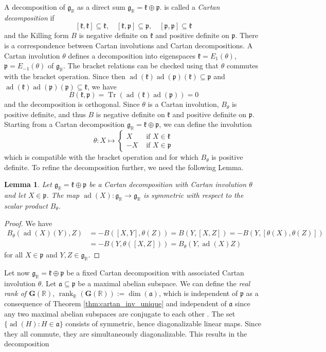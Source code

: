 \documentclass[12pt]{amsart}
\newcommand{\R}{\mathbb{R} }
\newcommand{\frakg}{\mathfrak{g}}
\newcommand{\frakp}{\mathfrak{p}}
\newcommand{\frakk}{\mathfrak{k}}
\newcommand{\fraka}{\mathfrak{a}}
\newcommand{\bG}{\mathbf{G}}
\numberwithin{equation}{section}
\newtheorem{lemma}[theorem]{Lemma}
\theoremstyle{remark} %
\begin{document}
A decomposition of $\frakg_\R$ as a direct sum $
\frakg_\R =  \frakk \oplus \frakp.
$
is called a \emph{Cartan decomposition} if
$$
[\frakk, \frakk] \subseteq \frakk, \quad [\frakk, \frakp] \subseteq \frakp , \quad [\frakp, \frakp] \subseteq \frakk
$$
and the Killing form $B$ is negative definite on $\frakk$ and positive definite on $\frakp$. There is a correspondence between Cartan involutions and Cartan decompositions. A Cartan involution $\theta$ defines a decomposition into eigenspaces $\frakk = E_{1}(\theta)$, $\frakp = E_{-1}(\theta)$ of $\frakg_\R$. The bracket relations can be checked using that $\theta$ commutes with the bracket operation. Since then $\operatorname{ad}(\frakk)\operatorname{ad}(\frakp)(\frakk) \subseteq \frakp$ and $\operatorname{ad}(\frakk)\operatorname{ad}(\frakp)(\frakp) \subseteq \frakk$, we have 
$$
B(\frakk, \frakp) = \operatorname{Tr}(\operatorname{ad}(\frakk)\operatorname{ad}(\frakp)) = 0
$$ 
and the decomposition is orthogonal. Since $\theta$ is a Cartan involution, $B_\theta$ is positive definite, and thus $B$ is negative definite on $\frakk$ and positive definite on $\frakp$. Starting from a Cartan decomposition $\frakg_\R = \frakk \oplus \frakp$, we can define the involution
$$
\theta \colon X \mapsto \left\{\begin{matrix}
	X & \text{ if }X \in \frakk \\
	-X & \text{ if }X \in \frakp
\end{matrix} \right.
$$  
which is compatible with the bracket operation and for which $B_\theta$ is positive definite. To refine the decomposition further, we need the following Lemma.
\begin{lemma}
	Let $\frakg_\R = \frakk \oplus \frakp$ be a Cartan decomposition with Cartan involution $\theta$ and let $X \in \frakp$. The map $\operatorname{ad}(X) \colon \frakg_\R \to \frakg_\R$ is symmetric with respect to the scalar product $B_\theta$.
\end{lemma}
\begin{proof}
	We have
	\begin{align*}
		B_\theta(\operatorname{ad}(X)(Y),Z) & =-B([X,Y],\theta(Z)) = B(Y,[X,Z]) = - B(Y,[\theta(X),\theta(Z)])\\
		& = -B(Y,\theta([X,Z])) = B_\theta(Y,\operatorname{ad}(X)Z)
	\end{align*}  
for all $X \in \frakp$ and $Y,Z \in \frakg_\R$. 
\end{proof}
Let now $\frakg_\R = \frakk \oplus \frakp$ be a fixed Cartan decomposition with associated Cartan involution $\theta$. Let $\fraka \subseteq \frakp$ be a maximal abelian subspace. We can define the \emph{real rank of $\bG(\R)$}, $\operatorname{rank}_\R(\bG(\R)) := \operatorname{dim}(\fraka)$, which is independent of $\frakp$ as a consequence of Theorem \ref{thm:cartan_inv_unique} and independent of $\fraka$ since any two maximal abelian subspaces are conjugate to each other \cite[Theorem 6.51]{Kna}. The set $\{\operatorname{ad}(H) \colon H \in\fraka\}$ consists of symmetric, hence diagonalizable linear maps. Since they all commute, they are simultaneously diagonalizable. This results in the decomposition
\end{document}
